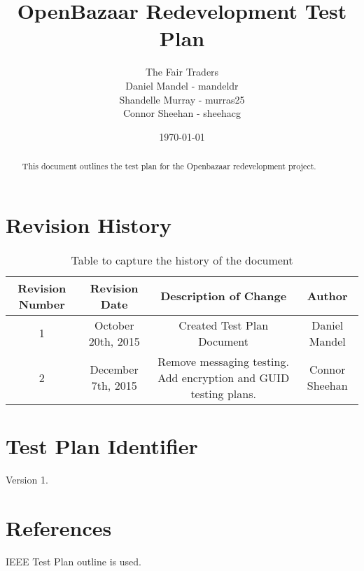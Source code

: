 \documentclass{article}
\begin{document}
\title{OpenBazaar Redevelopment Test Plan}
\author{The Fair Traders \\ Daniel Mandel - mandeldr \\ Shandelle Murray - murras25 \\ Connor Sheehan - sheehacg}
\date{\today}
\maketitle

\begin{abstract}
This document outlines the test plan for the Openbazaar redevelopment project.
\end{abstract}

\clearpage

\tableofcontents

\clearpage

\section*{Revision History}

\begin{table}[h!]
\centering
\hspace*{-4cm}\begin{tabular}{||c c c c||} 
 \hline
 Revision Number & Revision Date & Description of Change & Author \\ [0.5ex] 
 \hline\hline
 1 & October 20th, 2015 & Created Test Plan Document & Daniel Mandel \\ [1ex] 
 \hline
 2 & December 7th, 2015 & Remove messaging testing. Add encryption and GUID testing plans. & Connor Sheehan \\ [1ex]
 \hline
\end{tabular}
\caption{Table to capture the history of the document}
\label{table:1}
\end{table}


\section*{Test Plan Identifier}
Version 1.

\section*{References}
IEEE Test Plan outline is used.
\end{document}
